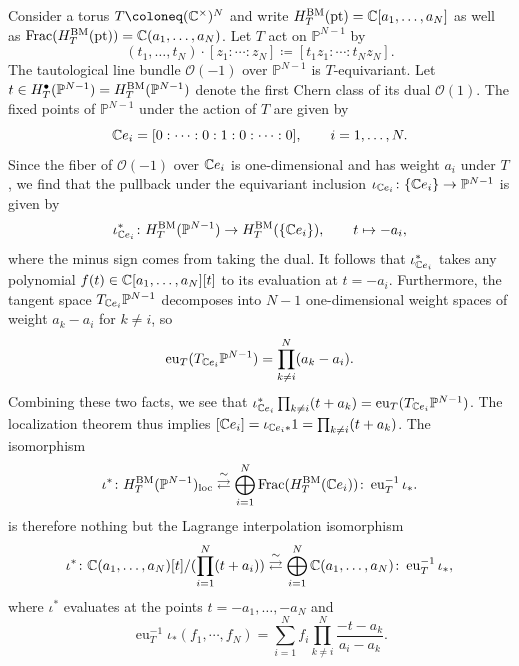\begin{example}
	Consider a torus $T \coloneq (\C^\times)^N$ and write $H_T^\textup{BM}(\textup{pt}) = \mathbb{C}[a_1,\dots,a_N]$ as well as $\operatorname{Frac}(H_T^\textup{BM}(\textup{pt})) = \mathbb{C}(a_1,\dots,a_N)$. Let $T$ act on $\mathbb{P}^{N-1}$ by
	\begin{equation}
		(t_1,\dots,t_N) \cdot [z_1 : \cdots : z_N] \coloneq [t_1 z_1 : \cdots : t_N z_N].
	\end{equation}
	The tautological line bundle $\mathcal{O}(-1)$ over $\mathbb{P}^{N-1}$ is $T$-equivariant. Let $t \in H_T^\bullet(\mathbb{P}^{N-1}) = H_T^\textup{BM}(\mathbb{P}^{N-1})$ denote the first Chern class of its dual $\mathcal{O}(1)$. The fixed points of $\mathbb{P}^{N-1}$ under the action of $T$ are given by
	\begin{equation}
		\mathbb{C} e_i = [0 : \cdots : 0 : 1 : 0 : \cdots : 0], \qquad i=1,\dots,N.
	\end{equation}
	Since the fiber of $\mathcal{O}(-1)$ over $\mathbb{C} e_i$ is one-dimensional and has weight $a_i$ under $T$, we find that the pullback under the equivariant inclusion $\iota_{\mathbb{C} e_i} \colon \{ \mathbb{C} e_i \} \to \mathbb{P}^{N-1}$ is given by
	\begin{equation}
		\iota_{\mathbb{C} e_i}^* \colon H_T^\textup{BM}(\mathbb{P}^{N-1}) \to H_T^\textup{BM}(\{ \mathbb{C} e_i \}), \qquad t \mapsto -a_i,
	\end{equation}
	where the minus sign comes from taking the dual. It follows that $\iota_{\mathbb{C} e_i}^*$ takes any polynomial $f(t) \in \mathbb{C}[a_1,\dots,a_N][t]$ to its evaluation at $t=-a_i$. Furthermore, the tangent space $T_{\mathbb{C} e_i} \mathbb{P}^{N-1}$ decomposes into $N-1$ one-dimensional weight spaces of weight $a_k - a_i$ for $k \neq i$, so
	\begin{equation}
		\operatorname{eu}_T(T_{\mathbb{C} e_i} \mathbb{P}^{N-1}) = \prod_{k \neq i}^N (a_k-a_i).
	\end{equation}
	Combining these two facts, we see that $\iota_{\mathbb{C} e_i}^* \prod_{k \neq i} (t+a_k) = \operatorname{eu}_T(T_{\mathbb{C} e_i} \mathbb{P}^{N-1})$. The localization theorem thus implies $[\mathbb{C} e_i] = \iota_{\mathbb{C} e_i*} 1 = \prod_{k \neq i} (t+a_k)$. The isomorphism
	\begin{equation}
		\iota^* \colon H_T^\textup{BM}(\mathbb{P}^{N-1})_\textup{loc} \overset \sim \rightleftarrows \bigoplus_{i=1}^N \operatorname{Frac}(H_T^\textup{BM}(\mathbb{C} e_i)) \colon \operatorname{eu}_T^{-1} \iota_*.
	\end{equation}
	is therefore nothing but the Lagrange interpolation isomorphism
	\begin{equation}
		\iota^* \colon \mathbb{C}(a_1,\dots,a_N)[t]/(\prod_{i=1}^N (t+a_i)) \overset \sim \rightleftarrows \bigoplus_{i=1}^N \mathbb{C}(a_1,\dots,a_N) \colon \operatorname{eu}_T^{-1} \iota_*,
	\end{equation}
	where $\iota^*$ evaluates at the points $t = -a_1,\dots,-a_N$ and
	\begin{equation}
		\operatorname{eu}_T^{-1} \iota_* (f_1,\cdots,f_N) = \sum_{i=1}^N f_i \prod_{k \neq i}^N \frac{-t-a_k}{a_i-a_k}.
	\end{equation}
\end{example}

